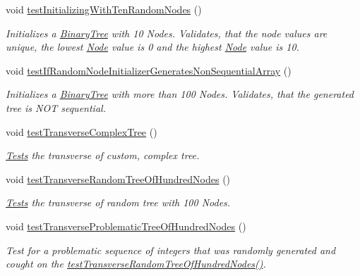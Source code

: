 \begin{DoxyCompactItemize}
void \hyperlink{class_binary_tree_amortized_analyis_1_1_tests_1_1_binary_tree_tests_a85474701b1fb3e189e09cf19c1fb300f}{test\+Initializing\+With\+Ten\+Random\+Nodes} ()
\begin{DoxyCompactList}\small\item\em Initializes a \hyperlink{class_binary_tree_amortized_analyis_1_1_binary_tree}{Binary\+Tree} with 10 Nodes. Validates, that the node values are unique, the lowest \hyperlink{class_binary_tree_amortized_analyis_1_1_node}{Node} value is 0 and the highest \hyperlink{class_binary_tree_amortized_analyis_1_1_node}{Node} value is 10. \end{DoxyCompactList}\item 
void \hyperlink{class_binary_tree_amortized_analyis_1_1_tests_1_1_binary_tree_tests_a5a7ea290b4737bc9afb9c322b16dff69}{test\+If\+Random\+Node\+Initializer\+Generates\+Non\+Sequential\+Array} ()
\begin{DoxyCompactList}\small\item\em Initializes a \hyperlink{class_binary_tree_amortized_analyis_1_1_binary_tree}{Binary\+Tree} with more than 100 Nodes. Validates, that the generated tree is N\+OT sequential. \end{DoxyCompactList}\item 
void \hyperlink{class_binary_tree_amortized_analyis_1_1_tests_1_1_binary_tree_tests_af8015fc18235460b19d2820956c41104}{test\+Transverse\+Complex\+Tree} ()
\begin{DoxyCompactList}\small\item\em \hyperlink{namespace_binary_tree_amortized_analyis_1_1_tests}{Tests} the transverse of custom, complex tree. \end{DoxyCompactList}\item 
void \hyperlink{class_binary_tree_amortized_analyis_1_1_tests_1_1_binary_tree_tests_a4ff2b6bdb43ae3a73a960682b232d156}{test\+Transverse\+Random\+Tree\+Of\+Hundred\+Nodes} ()
\begin{DoxyCompactList}\small\item\em \hyperlink{namespace_binary_tree_amortized_analyis_1_1_tests}{Tests} the transverse of random tree with 100 Nodes. \end{DoxyCompactList}\item 
void \hyperlink{class_binary_tree_amortized_analyis_1_1_tests_1_1_binary_tree_tests_a983ba085a0574658c34eb8bafb9e013b}{test\+Transverse\+Problematic\+Tree\+Of\+Hundred\+Nodes} ()
\begin{DoxyCompactList}\small\item\em Test for a problematic sequence of integers that was randomly generated and cought on the \hyperlink{class_binary_tree_amortized_analyis_1_1_tests_1_1_binary_tree_tests_a4ff2b6bdb43ae3a73a960682b232d156}{test\+Transverse\+Random\+Tree\+Of\+Hundred\+Nodes()}. \end{DoxyCompactList}\item 

\end{DoxyCompactItemize}
